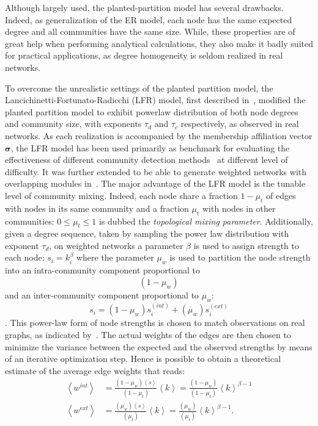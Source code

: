 Although largely used, the planted-partition model has several drawbacks.
Indeed, as generalization of the ER model, each node has the same expected degree and all communities have the same size.
While, these properties are of great help when performing analytical calculations, they also make it badly suited for practical applications, as degree homogeneity is seldom realized in real networks.

To overcome the unrealistic settings of the planted partition model, the Lancichinetti\hyp{}Fortunato\hyp{}Radicchi (LFR) model, first described in~\cite{lancichinetti2008}, modified the planted partition model to exhibit powerlaw distribution of both node degrees and community size, with exponents $\tau_d$ and $\tau_c$ respectively, as observed in real networks.
As each realization is accompanied by the membership affiliation vector $\boldsymbol \sigma$, the LFR model has been used primarily as benchmark for evaluating the effectiveness of different community detection methods~\cite{fortunato2010,lancichinetti2009} at different level of difficulty. It was further extended to be able to generate weighted networks with overlapping modules in~\cite{lancichinetti2009a}.
The major advantage of the LFR model is the tunable level of community mixing. Indeed, each node share a fraction $1-\mu_t$ of edges with nodes in its same community and a fraction $\mu_t$ with nodes in other communities: $0 \leq \mu_t \leq 1$ is dubbed the \emph{topological mixing parameter}.
Additionally, given a degree sequence, taken by sampling the power law distribution with exponent $\tau_d$, on weighted networks a parameter $\beta$ is used to assign strength to each node: $s_i=k_i^\beta$ where the parameter $\mu_w$ is used to partition the node strength into an intra-community component proportional to $$(1-\mu_w)$$ and an inter-community component proportional to $\mu_w$: $$s_i = (1-\mu_w)s_i^{(int)} + (\mu_w)s_i^{(ext)}$$. This power-law form of node strengths is chosen to match observations on real graphs, as indicated by~\cite{barrat2004}.
The actual weights of the edges are then chosen to minimize the variance between the expected and the observed strengths by means of an iterative optimization step. Hence is possible to obtain a theoretical estimate of the average edge weights that reads:
\begin{align}
\left< w^{int} \right> &= \frac{(1-\mu_w)\left< s\right>}{(1-\mu_t)}\left< k\right> = \frac{(1-\mu_w)}{(1-\mu_t)}\left < k \right>^{\beta-1} \\
\left< w^{ext} \right> &= \frac{(\mu_w)\left< s\right>}{(\mu_t)}\left< k\right> = \frac{(\mu_w)}{(\mu_t)}\left < k \right>^{\beta-1}.
\end{align}
